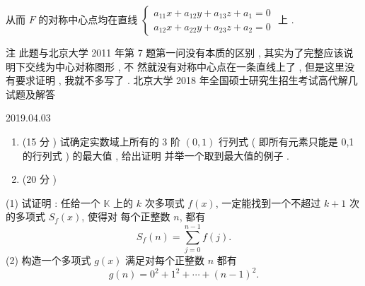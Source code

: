 \documentclass[10pt]{article}
\begin{document}
 从而  $F$  的对称中心点均在直线  $\left\{\begin{array}{l}a_{11} x+a_{12} y+a_{13} z+a_{1}=0 \\ a_{12} x+a_{22} y+a_{23} z+a_{2}=0\end{array}\right.$  上 .

 注   此题与北京大学  2011  年第  7  题第一问没有本质的区别 ,  其实为了完整应该说明下交线为中心对称图形 ,  不   然就没有对称中心点在一条直线上了 ,  但是这里没有要求证明 ,  我就不多写了 .  北京大学  2018  年全国硕士研究生招生考试高代解几试题及解答 

   

2019.04.03

\begin{enumerate}
  \item (15  分 )  试确定实数域上所有的  3  阶  $(0,1)$  行列式  ( 即所有元素只能是  0,1  的行列式 )  的最大值 ,  给出证明   并举一个取到最大值的例子 .

  \item (20  分 )

\end{enumerate}
(1)  试证明 :  任给一个  $\mathbb{K}$  上的  $k$  次多项式  $f(x)$,  一定能找到一个不超过  $k+1$  次的多项式  $S_{f}(x)$,  使得对   每个正整数  $n$,  都有 
$$
S_{f}(n)=\sum_{j=0}^{n-1} f(j) .
$$
(2)  构造一个多项式  $g(x)$  满足对每个正整数  $n$  都有 
$$
g(n)=0^{2}+1^{2}+\cdots+(n-1)^{2} .
$$
\end{document}
